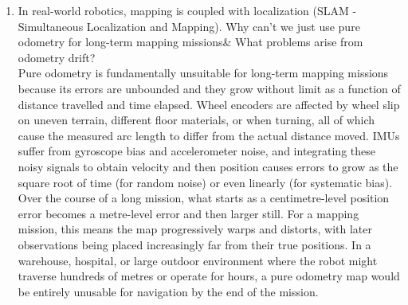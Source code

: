 \documentclass[11 pt , a 4 paper ]{article}
\theoremstyle{definition}
\begin{document}
\begin{enumerate}
    \item In real-world robotics, mapping is coupled with localization (SLAM - Simultaneous Localization and Mapping). Why can't we just use pure odometry for long-term mapping missions\& What problems arise from odometry drift?\\ 
      \newline \noindent Pure odometry is fundamentally unsuitable for long-term mapping missions because its errors are unbounded and they grow without limit as a function of distance travelled and time elapsed. Wheel encoders are affected by wheel slip on uneven terrain, different floor materials, or when turning, all of which cause the measured arc length to differ from the actual distance moved. IMUs suffer from gyroscope bias and accelerometer noise, and integrating these noisy signals to obtain velocity and then position causes errors to grow as the square root of time (for random noise) or even linearly (for systematic bias). Over the course of a long mission, what starts as a centimetre-level position error becomes a metre-level error and then larger still. For a mapping mission, this means the map progressively warps and distorts, with later observations being placed increasingly far from their true positions. In a warehouse, hospital, or large outdoor environment where the robot might traverse hundreds of metres or operate for hours, a pure odometry map would be entirely unusable for navigation by the end of the mission.
  \end{enumerate}
\end{document}
